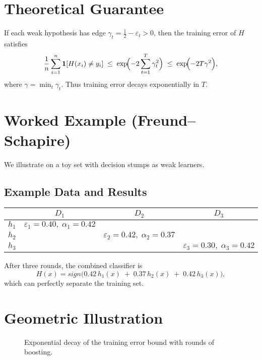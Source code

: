 \documentclass[11pt]{article}
\begin{document}
\section{Theoretical Guarantee}
If each weak hypothesis has edge $\gamma_t = \tfrac12 - \varepsilon_t>0$, then the training error of $H$ satisfies
\[
  \frac1n\sum_{i=1}^n \mathbf{1}[H(x_i)\neq y_i]
  \;\le\;\exp\!\Bigl(-2\sum_{t=1}^T \gamma_t^2\Bigr)
  \;\le\;\exp\!\Bigl(-2T\gamma^2\Bigr),
\]
where $\gamma = \min_t\gamma_t$. Thus training error decays exponentially in $T$.

\section{Worked Example (Freund--Schapire)}
We illustrate on a toy set with decision stumps as weak learners.

\subsection{Example Data and Results}
\begin{center}
\begin{tabular}{c|ccc}
 & $D_1$ & $D_2$ & $D_3$ \\
\hline
$h_1$ & $\varepsilon_1=0.40,\;\alpha_1=0.42$ & & \\
$h_2$ & & $\varepsilon_2=0.42,\;\alpha_2=0.37$ & \\
$h_3$ & & & $\varepsilon_3=0.30,\;\alpha_3=0.42$ \\
\end{tabular}
\end{center}
After three rounds, the combined classifier is
\[
  H(x) = sign\bigl(0.42\,h_1(x) \;+\; 0.37\,h_2(x)\;+\;0.42\,h_3(x)\bigr),
\]
which can perfectly separate the training set.

\section{Geometric Illustration}
\begin{figure}[h]
\centering
{}
\caption{Exponential decay of the training error bound with rounds of boosting.}
\end{figure}
\end{document}

